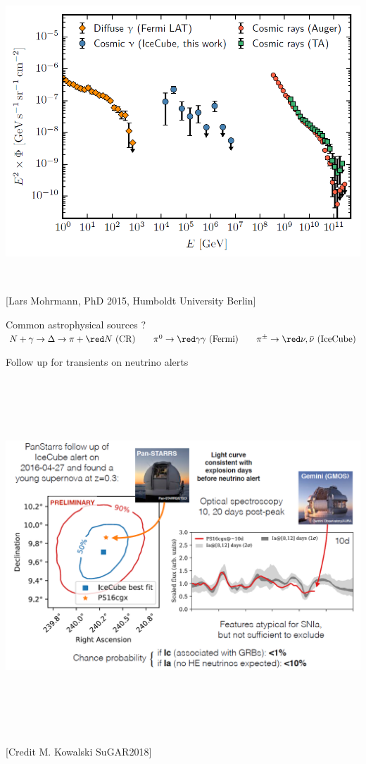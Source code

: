 \onecolumn
\begin{center}
\includegraphics[keepaspectratio,height=12cm]{Fermi-IC-CR}\\
{\large [Lars Mohrmann, PhD 2015, Humboldt University Berlin]}
\end{center}
%
{\blue
Common astrophysical sources ?\\
$N+\gamma \rightarrow \Delta \rightarrow \pi+{\red N \text{~(CR)}}
 \qquad \pi^{0} \rightarrow {\red \gamma\gamma \text{~(Fermi)}} \qquad \pi^{\pm} \rightarrow {\red \nu,\bar{\nu} \text{~(IceCube)}}$
}

\Tr
\onecolumn
\begin{center}
{\blue Follow up for transients on neutrino alerts}
\includegraphics[keepaspectratio,height=14cm]{IC160427A}\\
{\large [Credit M. Kowalski SuGAR2018]}
\end{center}

